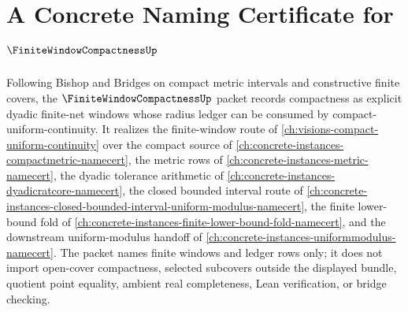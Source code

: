 \chapter{A Concrete Naming Certificate for $\FiniteWindowCompactnessUp$}
\label{ch:concrete-instances-finite-window-compactness-namecert}

Following Bishop and Bridges on compact metric intervals and constructive finite covers, the $\FiniteWindowCompactnessUp$ packet records compactness as explicit dyadic finite-net windows whose radius ledger can be consumed by compact-uniform-continuity. It realizes the finite-window route of \autoref{ch:visions-compact-uniform-continuity} over the compact source of \autoref{ch:concrete-instances-compactmetric-namecert}, the metric rows of \autoref{ch:concrete-instances-metric-namecert}, the dyadic tolerance arithmetic of \autoref{ch:concrete-instances-dyadicratcore-namecert}, the closed bounded interval route of \autoref{ch:concrete-instances-closed-bounded-interval-uniform-modulus-namecert}, the finite lower-bound fold of \autoref{ch:concrete-instances-finite-lower-bound-fold-namecert}, and the downstream uniform-modulus handoff of \autoref{ch:concrete-instances-uniformmodulus-namecert}. The packet names finite windows and ledger rows only; it does not import open-cover compactness, selected subcovers outside the displayed bundle, quotient point equality, ambient real completeness, Lean verification, or bridge checking.

